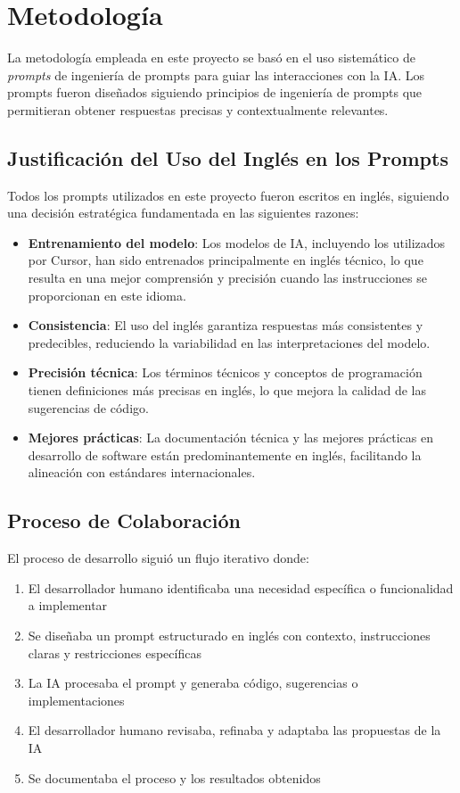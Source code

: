 \documentclass[12pt,a4paper]{article}
\begin{document}
\section{Metodología}

La metodología empleada en este proyecto se basó en el uso sistemático de \textit{prompts} de ingeniería de prompts para guiar las interacciones con la IA. Los prompts fueron diseñados siguiendo principios de ingeniería de prompts que permitieran obtener respuestas precisas y contextualmente relevantes.

\subsection{Justificación del Uso del Inglés en los Prompts}

Todos los prompts utilizados en este proyecto fueron escritos en inglés, siguiendo una decisión estratégica fundamentada en las siguientes razones:

\begin{itemize}
    \item \textbf{Entrenamiento del modelo}: Los modelos de IA, incluyendo los utilizados por Cursor, han sido entrenados principalmente en inglés técnico, lo que resulta en una mejor comprensión y precisión cuando las instrucciones se proporcionan en este idioma.
    \item \textbf{Consistencia}: El uso del inglés garantiza respuestas más consistentes y predecibles, reduciendo la variabilidad en las interpretaciones del modelo.
    \item \textbf{Precisión técnica}: Los términos técnicos y conceptos de programación tienen definiciones más precisas en inglés, lo que mejora la calidad de las sugerencias de código.
    \item \textbf{Mejores prácticas}: La documentación técnica y las mejores prácticas en desarrollo de software están predominantemente en inglés, facilitando la alineación con estándares internacionales.
\end{itemize}

\subsection{Proceso de Colaboración}

El proceso de desarrollo siguió un flujo iterativo donde:

\begin{enumerate}
    \item El desarrollador humano identificaba una necesidad específica o funcionalidad a implementar
    \item Se diseñaba un prompt estructurado en inglés con contexto, instrucciones claras y restricciones específicas
    \item La IA procesaba el prompt y generaba código, sugerencias o implementaciones
    \item El desarrollador humano revisaba, refinaba y adaptaba las propuestas de la IA
    \item Se documentaba el proceso y los resultados obtenidos
\end{enumerate}
\end{document}
